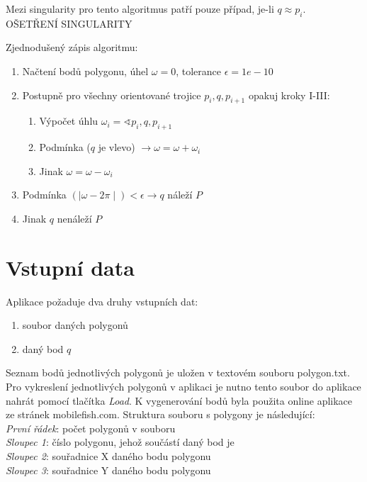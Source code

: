 \documentclass[a4paper, 12pt]{article}
\begin{document}
Mezi singularity pro tento algoritmus patří pouze případ, je-li $q\approx p_i$.\\
OŠETŘENÍ SINGULARITY

Zjednodušený zápis algoritmu:

\begin{enumerate}
\item Načtení bodů polygonu, úhel $\omega = 0$, tolerance $\epsilon = 1e-10$
\item Postupně pro všechny orientované trojice $p_i, q, p_{i+1}$ opakuj kroky I-III:
\begin{enumerate}[label=\Roman*.]
\item Výpočet úhlu $\omega_i = \sphericalangle p_i, q, p_{i+1}$
\item Podmínka ($q$ je vlevo) $\rightarrow \omega = \omega + \omega_i$
\item Jinak $\omega = \omega - \omega_i$
\end{enumerate}
\item Podmínka $(\mid \omega - 2\pi \mid) < \epsilon \rightarrow q$ náleží $P$
\item Jinak  $q$ nenáleží $P$
\end{enumerate}

\section{Vstupní data}
Aplikace požaduje dva druhy vstupních dat:

\begin{enumerate}
\item soubor daných polygonů
\item daný bod $q$
\end{enumerate}

Seznam bodů jednotlivých polygonů je uložen v textovém souboru polygon.txt. Pro vykreslení jednotlivých polygonů v aplikaci je nutno tento soubor do aplikace nahrát pomocí tlačítka \textsl{Load}. K vygenerování bodů byla použita online aplikace ze stránek mobilefish.com. Struktura souboru s polygony je následující:\\

\noindent
\textsl{První řádek}: počet polygonů v souboru\\
\textsl{Sloupec 1}: číslo polygonu, jehož součástí daný bod je\\
\textsl{Sloupec 2}: souřadnice X daného bodu polygonu\\
\textsl{Sloupec 3}: souřadnice Y daného bodu polygonu\\
\end{document}
